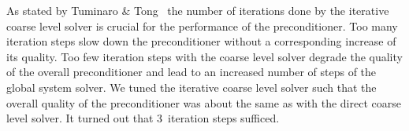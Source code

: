 As stated by Tuminaro \& Tong~\cite{tuto:00} the number of iterations
done by the iterative coarse level solver is crucial for the performance of the
preconditioner.  Too many iteration steps slow down the preconditioner without a
corresponding increase of its quality.  Too
few iteration steps with the coarse level solver degrade the quality of
the overall preconditioner and lead to an increased number of steps of
the global system solver.  We tuned the iterative coarse level solver
such that the overall quality of the preconditioner was about the same
as with the direct coarse level solver.  It turned out that 3~iteration
steps sufficed.



